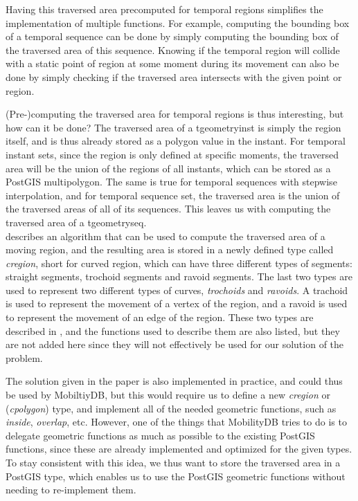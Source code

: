 Having this traversed area precomputed for temporal regions simplifies the implementation of multiple functions. For example, computing the bounding box of a temporal sequence can be done by simply computing the bounding box of the traversed area of this sequence. Knowing if the temporal region will collide with a static point of region at some moment during its movement can also be done by simply checking if the traversed area intersects with the given point or region.

(Pre-)computing the traversed area for temporal regions is thus interesting, but how can it be done? The traversed area of a tgeometryinst is simply the region itself, and is thus already stored as a polygon value in the instant. For temporal instant sets, since the region is only defined at specific moments, the traversed area will be the union of the regions of all instants, which can be stored as a PostGIS multipolygon. The same is true for temporal sequences with stepwise interpolation, and for temporal sequence set, the traversed area is the union of the traversed areas of all of its sequences. This leaves us with computing the traversed area of a tgeometryseq. \\

\cite{fmregion} describes an algorithm that can be used to compute the traversed area of a moving region, and the resulting area is stored in a newly defined type called \textit{cregion}, short for curved region, which can have three different types of segments: straight segments, trochoid segments and ravoid segments. The last two types are used to represent two different types of curves, \textit{trochoids} and \textit{ravoids}. A trachoid is used to represent the movement of a vertex of the region, and a ravoid is used to represent the movement of an edge of the region. These two types are described in \cite{fmregion}, and the functions used to describe them are also listed, but they are not added here since they will not effectively be used for our solution of the problem.

The solution given in the paper is also implemented in practice, and could thus be used by MobiltiyDB, but this would require us to define a new \textit{cregion} or (\textit{cpolygon}) type, and implement all of the needed geometric functions, such as \textit{inside}, \textit{overlap}, etc. However, one of the things that MobilityDB tries to do is to delegate geometric functions as much as possible to the existing PostGIS functions, since these are already implemented and optimized for the given types. To stay consistent with this idea, we thus want to store the traversed area in a PostGIS type, which enables us to use the PostGIS geometric functions without needing to re-implement them.

